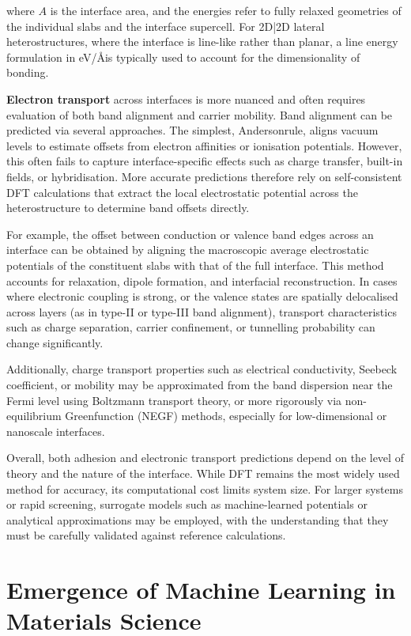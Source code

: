 where $A$ is the interface area, and the energies refer to fully relaxed geometries of the individual slabs and the
interface supercell. For 2D|2D lateral heterostructures, where the interface is line-like rather than planar, a line
energy formulation in eV/\AA is typically used to account for the dimensionality of bonding.

\textbf{Electron transport} across interfaces is more nuanced and often requires evaluation of both band alignment and
carrier mobility. Band alignment can be predicted via several approaches. The simplest, Anderson\rqss rule, aligns vacuum
levels to estimate offsets from electron affinities or ionisation potentials. However, this often fails to capture
interface-specific effects such as charge transfer, built-in fields, or hybridisation. More accurate predictions
therefore rely on self-consistent DFT calculations that extract the local electrostatic potential across the
heterostructure to determine band offsets directly.

For example, the offset between conduction or valence band edges across an interface can be obtained by aligning the
macroscopic average electrostatic potentials of the constituent slabs with that of the full interface. This method
accounts for relaxation, dipole formation, and interfacial reconstruction. In cases where electronic coupling is
strong, or the valence states are spatially delocalised across layers (as in type-II or type-III band alignment),
transport characteristics such as charge separation, carrier confinement, or tunnelling probability can change
significantly.

Additionally, charge transport properties such as electrical conductivity, Seebeck coefficient, or mobility may be
approximated from the band dispersion near the Fermi level using Boltzmann transport theory, or more rigorously via
non-equilibrium Green\rqss function (NEGF) methods, especially for low-dimensional or nanoscale interfaces.

Overall, both adhesion and electronic transport predictions depend on the level of theory and the nature of the
interface. While DFT remains the most widely used method for accuracy, its computational cost limits system size. For
larger systems or rapid screening, surrogate models such as machine-learned potentials or analytical approximations may
be employed, with the understanding that they must be carefully validated against reference calculations.


\section{Emergence of Machine Learning in Materials Science}
\label{section:machine_learning}

